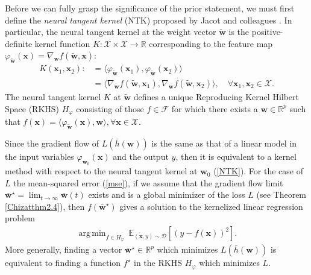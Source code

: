\documentclass{article}
\DeclareMathOperator*{\argmin}{arg\,min}
\begin{document}
Before we can fully grasp the significance of the prior statement, we must first define the \textit{neural tangent kernel} (NTK) proposed by Jacot and colleagues \cite{jacot2018neural}. In particular, the neural tangent kernel at the weight vector $\boldsymbol{\tilde{w}}$ is the positive-definite kernel function $K: \mathcal{X} \times \mathcal{X} \rightarrow \mathbb{R}$ corresponding to the feature map $\varphi_{\boldsymbol{\tilde{w}}}(\boldsymbol{x}) = \nabla_{\boldsymbol{w}} f(\boldsymbol{\tilde{w}}, \boldsymbol{x})$:
\begin{align}
    K(\boldsymbol{x}_1, \boldsymbol{x}_2) :&= \langle \varphi_{\boldsymbol{\tilde{w}}}(\boldsymbol{x}_1), \varphi_{\boldsymbol{\tilde{w}}}(\boldsymbol{x}_2) \rangle \nonumber \\
    &= \langle \nabla_{\boldsymbol{w}} f(\boldsymbol{\tilde{w}}, \boldsymbol{x}_1), \nabla_{\boldsymbol{w}} f(\boldsymbol{\tilde{w}}, \boldsymbol{x}_2) \rangle, \quad \forall \boldsymbol{x}_1, \boldsymbol{x}_2 \in \mathcal{X}\label{NTK}.
\end{align}
The neural tangent kernel $K$ at $\boldsymbol{\tilde{w}}$ defines a unique Reproducing Kernel Hilbert Space (RKHS) $H_{\varphi}$ consisting of those $f \in \mathcal{F}$ for which there exists a $\boldsymbol{w} \in \mathbb{R}^p$ such that $f(\boldsymbol{x}) = \langle \varphi_{\boldsymbol{\tilde{w}}}(\boldsymbol{x}), \boldsymbol{w} \rangle, \forall \boldsymbol{x} \in \mathcal{X}$. 

Since the gradient flow of $L(\bar{h}(\boldsymbol{w}))$ is the same as that of a linear model in the input variables $\varphi_{\boldsymbol{w}_0}(\boldsymbol{x})$ and the output $y$, then it is equivalent to a kernel method with respect to the neural tangent kernel at $\boldsymbol{w}_0$ (\ref{NTK}). For the case of $L$ the mean-squared error (\ref{mse}), if we assume that the gradient flow limit $\boldsymbol{\bar{w}}^{\star} = \lim_{t \to \infty} \boldsymbol{\bar{w}}(t)$ exists and is a global minimizer of the loss $L$ (see Theorem \ref{Chizatthm2.4}), then $f(\boldsymbol{\bar{w}}^{\star})$ gives a solution to the kernelized linear regression problem
\begin{align*}
    \argmin_{f \in H_{\varphi}} \ \mathbb{E}_{(\boldsymbol{x}, y) \sim \mathcal{D}}\left[(y - f(\boldsymbol{x}))^2 \right].
\end{align*}
More generally, finding a vector $\boldsymbol{\bar{w}}^{\star} \in \mathbb{R}^p$ which minimizes $L(\bar{h}(\boldsymbol{w}))$ is equivalent to finding a function $f^{\star}$ in the RKHS $H_{\varphi}$ which minimizes $L$.
\end{document}
